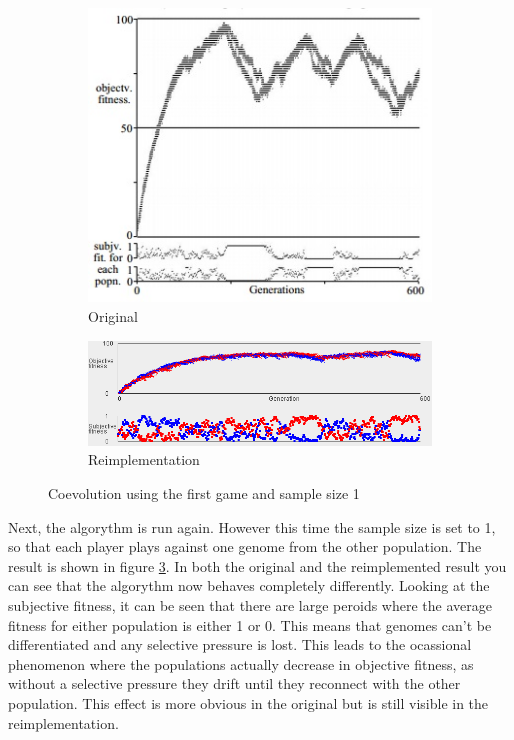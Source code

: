 \documentclass{article}
\begin{document}
\begin{figure}
\centering
\begin{subfigure}{.5\textwidth}
  \centering
  \includegraphics[width=.8\linewidth]{Screencaps/GradientLossOrig}
  \caption{Original}
  \label{fig:eq1S1orig}
\end{subfigure}%
\begin{subfigure}{.5\textwidth}
  \centering
  \includegraphics[width=\linewidth]{Screencaps/GradientLossReimp}
  \caption{Reimplementation}
  \label{fig:eq1S1reimp}
\end{subfigure}
\caption{Coevolution using the first game and sample size 1}
\label{fig:eq1S1}
\end{figure}

Next, the algorythm is run again. However this time the sample size is set to 1, so that each player plays against one genome from the other population. The result is shown in figure \ref{fig:eq1S1}. In both the original and the reimplemented result you can see that the algorythm now behaves completely differently. Looking at the subjective fitness, it can be seen that there are large peroids where the average fitness for either population is either 1 or 0. This means that genomes can't be differentiated and any selective pressure is lost. This leads to the ocassional phenomenon where the populations actually decrease in objective fitness, as without a selective pressure they drift until they reconnect with the other population. This effect is more obvious in the original but is still visible in the reimplementation.
\end{document}
